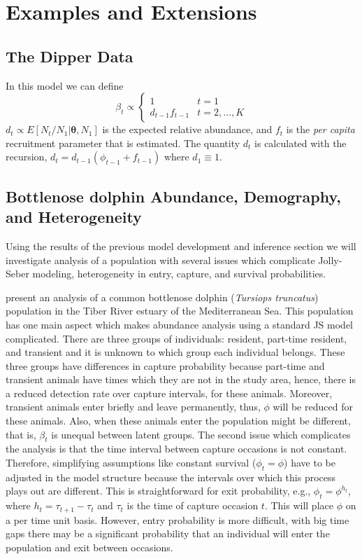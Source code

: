 \documentclass[12pt]{article}
\newcommand{\bt}{\ensuremath{\boldsymbol{\theta}}}
\begin{document}
\section{Examples and Extensions}

\subsection{The Dipper Data}\label{sec:dipper}

In this model we can define 
\[
\beta_t \propto \left\{ \begin{array}{ll}
1  & t=1\\
d_{t-1} f_{t-1} & t=2,\dots,K
\end{array} \right.
\]
$d_t \propto E[N_t/N_1|\bt, N_1]$ is the expected relative abundance, and $f_t$ is the {\it per capita} recruitment parameter that is estimated. The quantity $d_t$ is calculated with the recursion, $d_{t} = d_{t-1}(\phi_{t-1} + f_{t-1})$ where $d_1 \equiv 1$. 

\subsection{Bottlenose dolphin Abundance, Demography, and Heterogeneity}

Using the results of the previous model development and inference section we will investigate analysis of a population with several issues which complicate Jolly-Seber modeling, heterogeneity in entry, capture, and survival probabilities. 

\cite{caruso2024finite} present an analysis of a common bottlenose dolphin ({\it Tursiops truncatus}) population in the Tiber River estuary of the Mediterranean Sea. This population has one main aspect which makes abundance analysis using a standard JS model complicated. There are three groups of individuals: resident, part-time resident, and transient and it is unknown to which group each individual belongs. These three groups have differences in capture probability because part-time and transient animals have times which they are not in the study area, hence, there is a reduced detection rate over capture intervals, for these animals. Moreover, transient animals enter briefly and leave permanently, thus, $\phi$ will be reduced for these animals. Also, when these animals enter the population might be different, that is, $\beta_t$ is unequal between latent groups. The second issue which complicates the analysis is that the time interval between capture occasions is not constant. Therefore, simplifying assumptions like constant survival ($\phi_t=\phi$) have to be adjusted in the model structure because the intervals over which this process plays out are different. This is straightforward for exit probability, e.g., $\phi_t = \phi^{h_t}$, where $h_t=\tau_{t+1}-\tau_t$ and $\tau_t$ is the time of capture occasion $t$. This will place $\phi$ on a per time unit basis. However, entry probability is more difficult, with big time gaps there may be a significant probability that an individual will enter the population and exit between occasions. 
\end{document}
